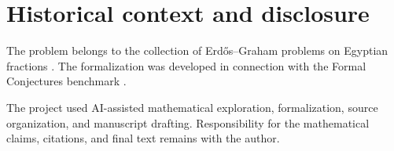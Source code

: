 \section{Historical context and disclosure}

The problem belongs to the collection of Erd\H{o}s--Graham problems on Egyptian
fractions \cite{ErdosGraham1980}.  The formalization was developed in connection
with the Formal Conjectures benchmark \cite{FormalConjectures2026}.

The project used AI-assisted mathematical exploration, formalization, source
organization, and manuscript drafting.  Responsibility for the mathematical
claims, citations, and final text remains with the author.

